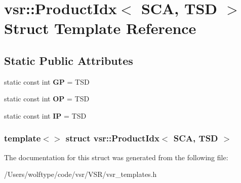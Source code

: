 \hypertarget{structvsr_1_1_product_idx_3_01_s_c_a_00_01_t_s_d_01_4}{\section{vsr\-:\-:Product\-Idx$<$ S\-C\-A, T\-S\-D $>$ Struct Template Reference}
\label{structvsr_1_1_product_idx_3_01_s_c_a_00_01_t_s_d_01_4}
}
\subsection*{Static Public Attributes}
\begin{DoxyCompactItemize}
\item 
\hypertarget{structvsr_1_1_product_idx_3_01_s_c_a_00_01_t_s_d_01_4_a45b9d6bc3454b26a818d18033f41b938}{static const int {\bfseries G\-P} = T\-S\-D}\label{structvsr_1_1_product_idx_3_01_s_c_a_00_01_t_s_d_01_4_a45b9d6bc3454b26a818d18033f41b938}

\item 
\hypertarget{structvsr_1_1_product_idx_3_01_s_c_a_00_01_t_s_d_01_4_ae87cfd08648abf145ed8375250d46fa4}{static const int {\bfseries O\-P} = T\-S\-D}\label{structvsr_1_1_product_idx_3_01_s_c_a_00_01_t_s_d_01_4_ae87cfd08648abf145ed8375250d46fa4}

\item 
\hypertarget{structvsr_1_1_product_idx_3_01_s_c_a_00_01_t_s_d_01_4_a8d0fd2155d34f4f629499928b9f5f6f0}{static const int {\bfseries I\-P} = T\-S\-D}\label{structvsr_1_1_product_idx_3_01_s_c_a_00_01_t_s_d_01_4_a8d0fd2155d34f4f629499928b9f5f6f0}

\end{DoxyCompactItemize}
\subsubsection*{template$<$$>$ struct vsr\-::\-Product\-Idx$<$ S\-C\-A, T\-S\-D $>$}



The documentation for this struct was generated from the following file\-:\begin{DoxyCompactItemize}
\item 
/\-Users/wolftype/code/vsr/\-V\-S\-R/vsr\-\_\-templates.\-h\end{DoxyCompactItemize}
